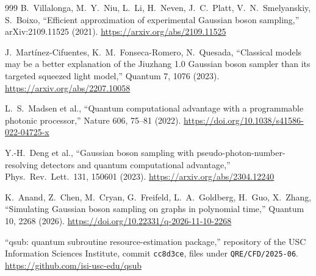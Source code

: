 \documentclass[10pt,a4paper]{article}
\begin{document}
\begin{thebibliography}{999}
 B.~Villalonga, M.~Y.~Niu, L.~Li, H.~Neven, J.~C.~Platt, V.~N.~Smelyanskiy, S.~Boixo, ``Efficient approximation of experimental Gaussian boson sampling,'' arXiv:2109.11525 (2021). \url{https://arxiv.org/abs/2109.11525}

 J.~Mart\'inez-Cifuentes, K.~M.~Fonseca-Romero, N.~Quesada, ``Classical models may be a better explanation of the Jiuzhang 1.0 Gaussian boson sampler than its targeted squeezed light model,'' Quantum 7, 1076 (2023). \url{https://arxiv.org/abs/2207.10058}

 L.~S.~Madsen et al., ``Quantum computational advantage with a programmable photonic processor,'' Nature 606, 75--81 (2022). \url{https://doi.org/10.1038/s41586-022-04725-x}

 Y.-H.~Deng et al., ``Gaussian boson sampling with pseudo-photon-number-resolving detectors and quantum computational advantage,'' Phys.\ Rev.\ Lett.\ 131, 150601 (2023). \url{https://arxiv.org/abs/2304.12240}

 K.~Anand, Z.~Chen, M.~Cryan, G.~Freifeld, L.~A.~Goldberg, H.~Guo, X.~Zhang, ``Simulating Gaussian boson sampling on graphs in polynomial time,'' Quantum 10, 2268 (2026). \url{https://doi.org/10.22331/q-2026-11-10-2268}

 ``qsub: quantum subroutine resource-estimation package,'' repository of the USC Information Sciences Institute, commit \texttt{cc8d3ce}, files under \texttt{QRE/CFD/2025-06}. \url{https://github.com/isi-usc-edu/qsub}


\end{thebibliography}
\end{document}
